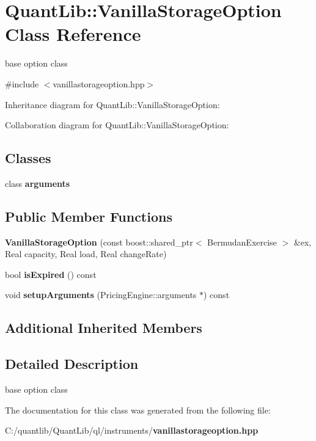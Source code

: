 \section{Quant\+Lib\+:\+:Vanilla\+Storage\+Option Class Reference}
\label{class_quant_lib_1_1_vanilla_storage_option}


base option class  




{\ttfamily \#include $<$vanillastorageoption.\+hpp$>$}



Inheritance diagram for Quant\+Lib\+:\+:Vanilla\+Storage\+Option\+:


Collaboration diagram for Quant\+Lib\+:\+:Vanilla\+Storage\+Option\+:
\subsection*{Classes}
\begin{DoxyCompactItemize}
\item 
class {\bf arguments}
\end{DoxyCompactItemize}
\subsection*{Public Member Functions}
\begin{DoxyCompactItemize}
\item 
{\bfseries Vanilla\+Storage\+Option} (const boost\+::shared\+\_\+ptr$<$ Bermudan\+Exercise $>$ \&ex, Real capacity, Real load, Real change\+Rate)\label{class_quant_lib_1_1_vanilla_storage_option_a3ecb8ed3e30ff424ebc0882d5f30a22c}

\item 
bool {\bfseries is\+Expired} () const \label{class_quant_lib_1_1_vanilla_storage_option_a3da5b9a37dfdc00cd19f38ec12d5a958}

\item 
void {\bfseries setup\+Arguments} (Pricing\+Engine\+::arguments $\ast$) const \label{class_quant_lib_1_1_vanilla_storage_option_aa7b5fd91a223a9da74cee1f41257c4a4}

\end{DoxyCompactItemize}
\subsection*{Additional Inherited Members}


\subsection{Detailed Description}
base option class 

The documentation for this class was generated from the following file\+:\begin{DoxyCompactItemize}
\item 
C\+:/quantlib/\+Quant\+Lib/ql/instruments/{\bf vanillastorageoption.\+hpp}\end{DoxyCompactItemize}

